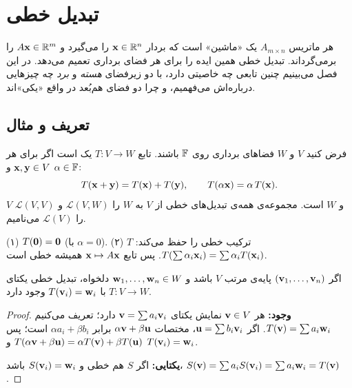 \chapter{تبدیل خطی}
\label{ch:linear-maps}

هر ماتریس $A_{m\times n}$ یک «ماشین» است که بردار $\mathbf{x}\in\mathbb{R}^n$ را می‌گیرد و $A\mathbf{x}\in\mathbb{R}^m$ را برمی‌گرداند. تبدیل خطی همین ایده را برای هر فضای برداری  تعمیم می‌دهد. در این فصل می‌بینیم چنین تابعی چه خاصیتی دارد، با دو زیرفضای  \emph{هسته} و \emph{برد} چه چیزهایی درباره‌اش می‌فهمیم، و چرا دو فضای هم‌بُعد در واقع «یکی»اند.

\section{تعریف و مثال}

\begin{definition}
فرض کنید $V$ و $W$ فضاهای برداری روی $\mathbb{F}$ باشند. تابع $T:V\to W$ یک  است اگر برای هر $\mathbf{x},\mathbf{y}\in V$ و $\alpha\in\mathbb{F}$:
\[
T(\mathbf{x}+\mathbf{y})=T(\mathbf{x})+T(\mathbf{y}),\qquad T(\alpha\mathbf{x})=\alpha\,T(\mathbf{x}).
\]
$V$  و $W$  است. مجموعه‌ی همه‌ی تبدیل‌های خطی از $V$ به $W$ را $\mathcal{L}(V,W)$ و $\mathcal{L}(V,V)$ را $\mathcal{L}(V)$ می‌نامیم.
\end{definition}

\begin{note}
(۱) $T(\mathbf{0})=\mathbf{0}$ (با $\alpha=0$). (۲) $T$ ترکیب خطی  را حفظ می‌کند: $T(\sum\alpha_i\mathbf{x}_i)=\sum\alpha_iT(\mathbf{x}_i)$. پس تابع $\mathbf{x}\mapsto A\mathbf{x}$ همیشه خطی است.
\end{note}

\begin{theorem}\label{thm:linmap-basis}
اگر $(\mathbf{v}_1,\dots,\mathbf{v}_n)$ پایه‌ی  مرتب  $V$ باشد و $\mathbf{w}_1,\dots,\mathbf{w}_n\in W$ دلخواه، تبدیل خطی یکتای $T:V\to W$ با $T(\mathbf{v}_i)=\mathbf{w}_i$ وجود دارد.
\end{theorem}
\begin{proof}
\textbf{وجود:} هر $\mathbf{v}\in V$ نمایش یکتای $\mathbf{v}=\sum a_i\mathbf{v}_i$ دارد؛ تعریف می‌کنیم $T(\mathbf{v})=\sum a_i\mathbf{w}_i$. اگر $\mathbf{u}=\sum b_i\mathbf{v}_i$، مختصات $\alpha\mathbf{v}+\beta\mathbf{u}$ برابر $\alpha a_i+\beta b_i$ است؛ پس $T(\alpha\mathbf{v}+\beta\mathbf{u})=\alpha T(\mathbf{v})+\beta T(\mathbf{u})$ و $T(\mathbf{v}_i)=\mathbf{w}_i$.

\textbf{یکتایی:} اگر $S$ هم خطی و $S(\mathbf{v}_i)=\mathbf{w}_i$ باشد، $S(\mathbf{v})=\sum a_iS(\mathbf{v}_i)=\sum a_i\mathbf{w}_i=T(\mathbf{v})$.
\end{proof}

